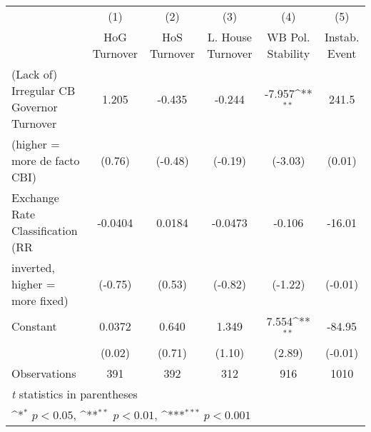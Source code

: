 \begin{table}[htbp]\centering
\def\sym#1{\ifmmode^{#1}\else\(^{#1}\)\fi}
\caption{\label{lowKIfivs2}}
\begin{tabular}{l*{5}{c}}
\toprule
                                        &\multicolumn{1}{c}{(1)}&\multicolumn{1}{c}{(2)}&\multicolumn{1}{c}{(3)}&\multicolumn{1}{c}{(4)}&\multicolumn{1}{c}{(5)}\\
                                        &\multicolumn{1}{c}{HoG Turnover}&\multicolumn{1}{c}{HoS Turnover}&\multicolumn{1}{c}{L. House Turnover}&\multicolumn{1}{c}{WB Pol. Stability}&\multicolumn{1}{c}{Instab. Event}\\
\midrule
(Lack of) Irregular CB Governor Turnover&    1.205         &   -0.435         &   -0.244         &   -7.957\sym{**} &    241.5         \\
(higher = more de facto CBI)            &   (0.76)         &  (-0.48)         &  (-0.19)         &  (-3.03)         &   (0.01)         \\
\addlinespace
Exchange Rate Classification (RR        &  -0.0404         &   0.0184         &  -0.0473         &   -0.106         &   -16.01         \\
inverted, higher = more fixed)          &  (-0.75)         &   (0.53)         &  (-0.82)         &  (-1.22)         &  (-0.01)         \\
\addlinespace
Constant                                &   0.0372         &    0.640         &    1.349         &    7.554\sym{**} &   -84.95         \\
                                        &   (0.02)         &   (0.71)         &   (1.10)         &   (2.89)         &  (-0.01)         \\
\midrule
Observations                            &      391         &      392         &      312         &      916         &     1010         \\
\bottomrule
\multicolumn{6}{l}{\footnotesize \textit{t} statistics in parentheses}\\
\multicolumn{6}{l}{\footnotesize \sym{*} \(p<0.05\), \sym{**} \(p<0.01\), \sym{***} \(p<0.001\)}\\
\end{tabular}
\end{table}
